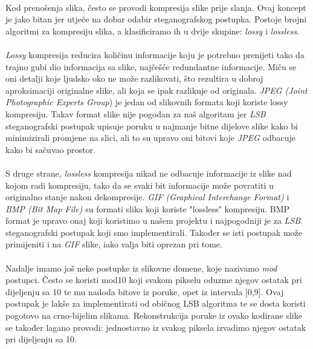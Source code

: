 \documentclass[times, utf8, seminar]{fer}
\begin{document}
\paragraph{}
Kod prenošenja slika, često se provodi kompresija slike prije slanja. Ovaj koncept je jako bitan jer utječe na dobar odabir steganografskog postupka. Postoje brojni algoritmi za kompresiju slika, a klasificiramo ih u dvije skupine: \textit{lossy} i \textit{lossless}.
\paragraph{}
\textit{Lossy} kompresija reducira količinu informacije koju je potrebno prenijeti tako da trajno gubi dio informacija sa slike, najčešće redundantne informacije. Miču se oni detalji koje ljudsko oko ne može razlikovati, što rezultira u dobroj aproksimaciji originalne slike, ali koja se ipak razlikuje od originala. \textit{JPEG (Joint Photographic Experts Group}) je jedan od slikovnih formata koji koriste lossy kompresiju. Takav format slike nije pogodan za naš algoritam jer \textit{LSB} steganografski postupak upisuje poruku u najmanje bitne dijelove slike kako bi minimizirali promjene na slici, ali to su upravo oni bitovi koje \textit{JPEG} odbacuje kako bi sačuvao prostor.
\paragraph{}
S druge strane, \textit{lossless} kompresija nikad ne odbacuje informacije iz slike nad kojom radi kompresiju, tako da se svaki bit informacije može povratiti u originalno stanje nakon dekompresije. \textit{GIF (Graphical Interchange Format)} i \textit{BMP (Bit Map File)} su formati slika koji koriste "lossless" kompresiju. BMP format je upravo onaj koji koristimo u našem projektu i najpogodniji je za \textit{LSB} steganografski postupak koji smo implementirali. Također se isti postupak može primijeniti i na \textit{GIF} slike, iako valja biti oprezan pri tome.

\paragraph{}
Nadalje imamo još neke postupke iz slikovne domene, koje nazivamo \textit{mod} postupci. Često se koristi mod10 koji svakom pikselu oduzme njegov ostatak pri dijeljenju sa 10 te mu nadoda bitove iz poruke, opet iz intervala [0,9]. Ovaj postupak je lakše za implementirati od običnog LSB algoritma te se dosta koristi pogotovo na crno-bijelim slikama. Rekonstrukcija poruke iz ovako kodirane slike se također lagano provodi: jednostavno iz svakog piksela izvadimo njegov ostatak pri dijeljenju sa 10.
\end{document}
